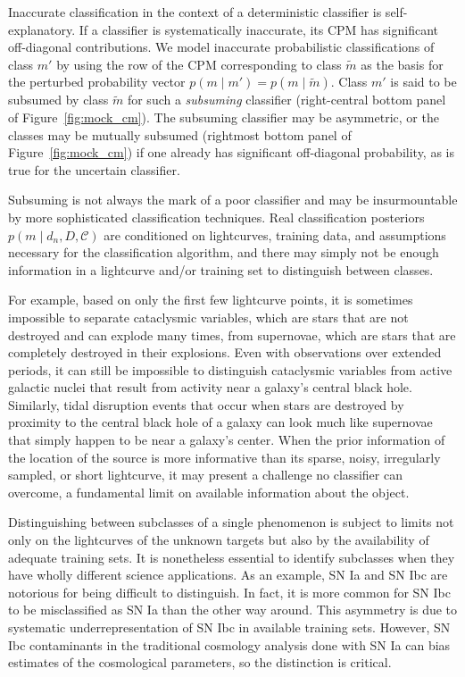 Inaccurate classification in the context of a deterministic classifier is self-explanatory.
If a classifier is systematically inaccurate, its CPM has significant off-diagonal contributions.
We model inaccurate probabilistic classifications of class $m'$ by using the row of the CPM corresponding to class $\tilde{m}$ as the basis for the perturbed probability vector $p(m \mid m') = p(m \mid \tilde{m})$.
Class $m'$ is said to be subsumed by class $\tilde{m}$ for such a \textit{subsuming} classifier (right-central bottom panel of Figure~\ref{fig:mock_cm}).
The subsuming classifier may be asymmetric, or the classes may be mutually subsumed (rightmost bottom panel of Figure~\ref{fig:mock_cm}) if one already has significant off-diagonal probability, as is true for the uncertain classifier.

Subsuming is not always the mark of a poor classifier and may be insurmountable by more sophisticated classification techniques.
Real classification posteriors $p(m \mid d_{n}, D, \mathcal{C})$ are conditioned on lightcurves, training data, and assumptions necessary for the classification algorithm, and there may simply not be enough information in a lightcurve and/or training set to distinguish between classes.

For example, based on only the first few lightcurve points, it is sometimes impossible to separate cataclysmic variables, which are stars that are not destroyed and can explode many times, from supernovae, which are stars that are completely destroyed in their explosions.
Even with observations over extended periods, it can still be impossible to distinguish cataclysmic variables from active galactic nuclei that result from activity near a galaxy's central black hole.
Similarly, tidal disruption events that occur when stars are destroyed by proximity to the central black hole of a galaxy can look much like supernovae that simply happen to be near a galaxy's center.
When the prior information of the location of the source is more informative than its sparse, noisy, irregularly sampled, or short lightcurve, it may present a challenge no classifier can overcome, a fundamental limit on available information about the object.

Distinguishing between subclasses of a single phenomenon is subject to limits not only on the lightcurves of the unknown targets but also by the availability of adequate training sets.
It is nonetheless essential to identify subclasses when they have wholly different science applications.
As an example, SN Ia and SN Ibc are notorious for being difficult to distinguish.
In fact, it is more common for SN Ibc to be misclassified as SN Ia than the other way around.
This asymmetry is due to systematic underrepresentation of SN Ibc in available training sets.
However, SN Ibc contaminants in the traditional cosmology analysis done with SN Ia can bias estimates of the cosmological parameters, so the distinction is critical.


